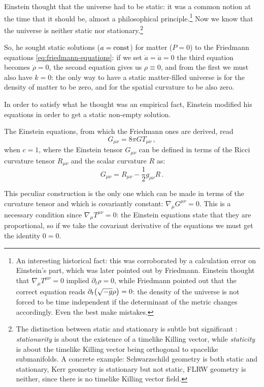 \documentclass[main.tex]{subfiles}
\begin{document}
Einstein thought that the universe had to be static: it was a common notion at the time that it should be, almost a philosophical principle.\footnote{An interesting historical fact: this was corroborated by a calculation error on Einstein's part, which was later pointed out by Friedmann. Einstein thought \cite{einsteinCommentFriedmannPaper1922} that \(\nabla_{\mu } T^{\mu \nu }= 0\) implied \(\partial_{t} \rho =0\), while Friedmann pointed out \cite{friedmannAlexanderFriedmann1922} that the correct equation reads \( \partial_{t} \qty(\sqrt{-g} \rho ) =0\): the density of the universe is not forced to be time independent if the determinant of the metric changes accordingly. Even the best make mistakes.}
Now we know that the universe is neither static nor stationary.\footnote{The distinction between static and stationary is subtle but significant \cite{ludvigsenGeneralRelativityGeometric1999}: \emph{stationarity} is about the existence of a timelike Killing vector, while \emph{staticity} is about the timelike Killing vector being orthogonal to spacelike submanifolds. 
A concrete example: Schwarzschild geometry is both static and stationary, Kerr geometry is stationary but not static, FLRW geometry is neither, since there is no timelike Killing vector field.}

So, he sought static solutions (\(a = \text{const}\)) for matter (\(P=0\)) to the Friedmann equations \eqref{eq:friedmann-equations}: if we set \(\dot{a} = \ddot{a} = 0\) 
the third equation becomes \(\dot{\rho}= 0\), the second equation gives us \(\rho \equiv 0\), and from the first we must also have \(k=0\): the only way to have a static matter-filled universe is for the density of matter to be zero, and for the spatial curvature to be also zero.

In order to satisfy what he thought was an empirical fact, Einstein modified his equations in order to get a static non-empty solution.

The Einstein equations, from which the Friedmann ones are derived, read 
%
\begin{equation}
  G_{\mu \nu } = 8 \pi G T_{\mu \nu }
\,,
\end{equation}
%
when \(c=1\), where the Einstein tensor \(G_{\mu \nu }\) can be defined in terms of the Ricci curvature tensor \(R_{\mu \nu }\) and the scalar curvature \(R\) as:
%
\begin{equation}
  G_{ \mu \nu } = R_{\mu \nu } - \frac{1}{2} g_{\mu \nu }R
\,.
\end{equation}

This peculiar construction is the only one which can be made in terms of the curvature tensor and which is covariantly constant: \(\nabla_{\mu } G^{\mu \nu } = 0\). 
This is a necessary condition since \(\nabla_{\mu } T^{\mu \nu }=0\): the Einstein equations state that they are proportional, so if we take the covariant derivative of the equations we must get the identity \(0=0\).
\end{document}
